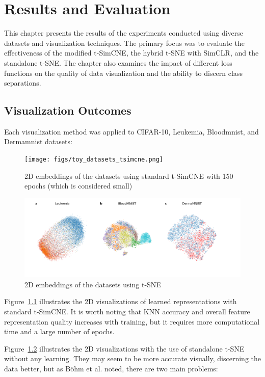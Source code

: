 \chapter{Results and Evaluation}
\label{chap:eval}

This chapter presents the results of the experiments conducted using diverse datasets and visualization techniques. The primary focus was to evaluate the effectiveness of the modified t-SimCNE, the hybrid t-SNE with SimCLR, and the standalone t-SNE. The chapter also examines the impact of different loss functions on the quality of data visualization and the ability to discern class separations.

\section{Visualization Outcomes}

Each visualization method was applied to CIFAR-10, Leukemia, Bloodmnist, and Dermamnist datasets:

\begin{figure}[hbt]
\centering
\texttt{[image: figs/toy\_datasets\_tsimcne.png]}
\caption{2D embeddings of the datasets using standard t-SimCNE with 150 epochs (which is considered small)
}
\label{fig:med_tsimcne}
\end{figure}

\begin{figure}[hbt]
\centering
\includegraphics[width=\textwidth]{figs/toy_datasets_tsne.png}
\caption{
2D embeddings of the datasets using t-SNE
}

\label{fig:med_tsne}
\end{figure}

Figure~\ref{fig:med_tsimcne} illustrates the 2D visualizations of learned representations with standard t-SimCNE. It is worth noting that KNN accuracy and overall feature representation quality increases with training, but it requires more computational time and a large number of epochs.

Figure~\ref{fig:med_tsne} illustrates the 2D visualizations with the use of standalone t-SNE without any learning. They may seem to be more accurate visually, discerning the data better, but as Böhm et al. \cite{tsimcne} noted, there are two main problems: 

